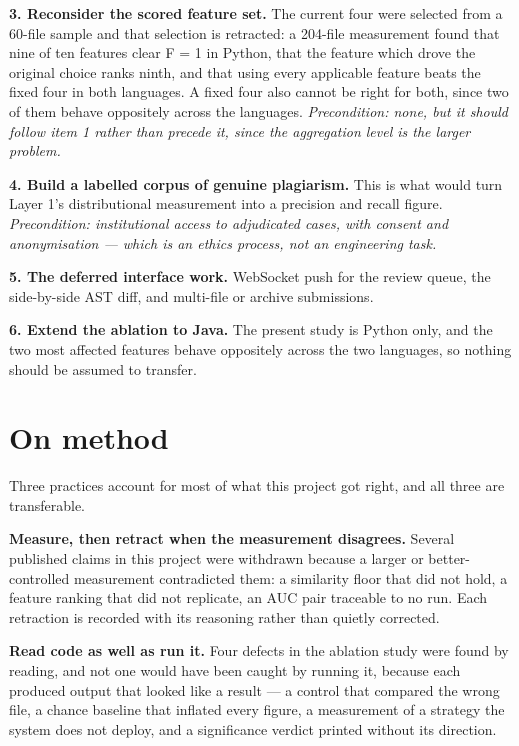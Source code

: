 \textbf{3. Reconsider the scored feature set.} The current four were
selected from a 60-file sample and that selection is retracted: a
204-file measurement found that nine of ten features clear F = 1 in
Python, that the feature which drove the original choice ranks ninth,
and that using every applicable feature beats the fixed four in both
languages. A fixed four also cannot be right for both, since two of them
behave oppositely across the languages. \emph{Precondition: none, but it
should follow item 1 rather than precede it, since the aggregation level
is the larger problem.}

\textbf{4. Build a labelled corpus of genuine plagiarism.} This is what
would turn Layer 1's distributional measurement into a precision and
recall figure. \emph{Precondition: institutional access to adjudicated
cases, with consent and anonymisation --- which is an ethics process,
not an engineering task.}

\textbf{5. The deferred interface work.} WebSocket push for the review
queue, the side-by-side AST diff, and multi-file or archive submissions.

\textbf{6. Extend the ablation to Java.} The present study is Python
only, and the two most affected features behave oppositely across the
two languages, so nothing should be assumed to transfer.

\hypertarget{on-method}{%
\section{On method}\label{on-method}}

Three practices account for most of what this project got right, and all
three are transferable.

\textbf{Measure, then retract when the measurement disagrees.} Several
published claims in this project were withdrawn because a larger or
better-controlled measurement contradicted them: a similarity floor that
did not hold, a feature ranking that did not replicate, an AUC pair
traceable to no run. Each retraction is recorded with its reasoning
rather than quietly corrected.

\textbf{Read code as well as run it.} Four defects in the ablation study
were found by reading, and not one would have been caught by running it,
because each produced output that looked like a result --- a control
that compared the wrong file, a chance baseline that inflated every
figure, a measurement of a strategy the system does not deploy, and a
significance verdict printed without its direction.

